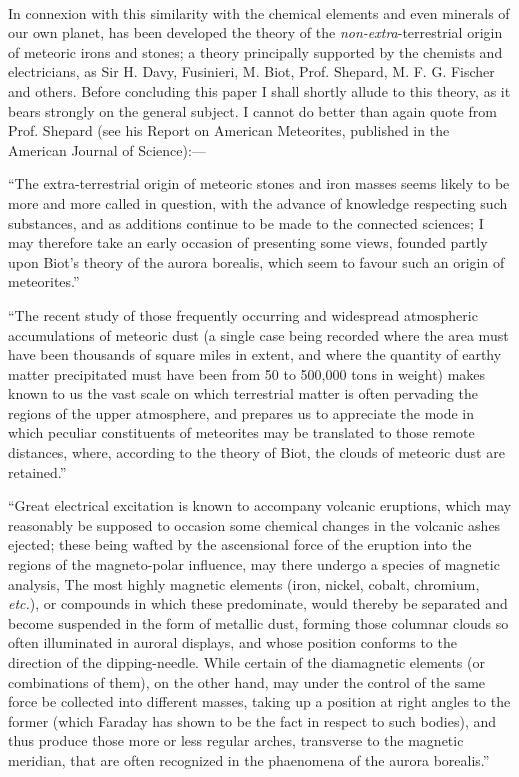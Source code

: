\documentclass[a4paper, 12pt, oneside]{article}
\begin{document}
\paragraph{}
In connexion with this similarity with the chemical elements and even minerals of our own planet, has been developed the theory of the \emph{non-extra}-terrestrial origin of meteoric irons and stones; a theory principally supported by the chemists and electricians, as Sir H. Davy, Fusinieri, M. Biot, Prof. Shepard, M. F. G. Fischer and others. Before concluding this paper I shall shortly allude to this theory, as it bears strongly on the general subject. I cannot do better than again quote from Prof. Shepard (see his Report on American Meteorites, published in the American Journal of Science):---

``The extra-terrestrial origin of meteoric stones and iron masses seems likely to be more and more called in question, with the advance of knowledge respecting such substances, and as additions continue to be made to the connected sciences; I may therefore take an early occasion of presenting some views, founded partly upon Biot's theory of the aurora borealis, which seem to favour such an origin of meteorites.''

``The recent study of those frequently occurring and widespread atmospheric accumulations of meteoric dust (a single case being recorded where the area must have been thousands of square miles in extent, and where the quantity of earthy matter precipitated must have been from 50 to 500,000 tons in weight) makes known to us the vast scale on which terrestrial matter is often pervading the regions of the upper atmosphere, and prepares us to appreciate the mode in which peculiar constituents of meteorites may be translated to those remote distances, where, according to the theory of Biot, the clouds of meteoric dust are retained.''

``Great electrical excitation is known to accompany volcanic eruptions, which may reasonably be supposed to occasion some chemical changes in the volcanic ashes ejected; these being wafted by the ascensional force of the eruption into the regions of the magneto-polar influence, may there undergo a species of magnetic analysis, The most highly magnetic elements (iron, nickel, cobalt, chromium, \emph{etc.}), or compounds in which these predominate, would thereby be separated and become suspended in the form of metallic dust, forming those columnar clouds so often illuminated in auroral displays, and whose position conforms to the direction of the dipping-needle. While certain of the diamagnetic elements (or combinations of them), on the other hand, may under the control of the same force be collected into different masses, taking up a position at right angles to the former (which Faraday has shown to be the fact in respect to such bodies), and thus produce those more or less regular arches, transverse to the magnetic meridian, that are often recognized in the phaenomena of the aurora borealis.''
\end{document}
